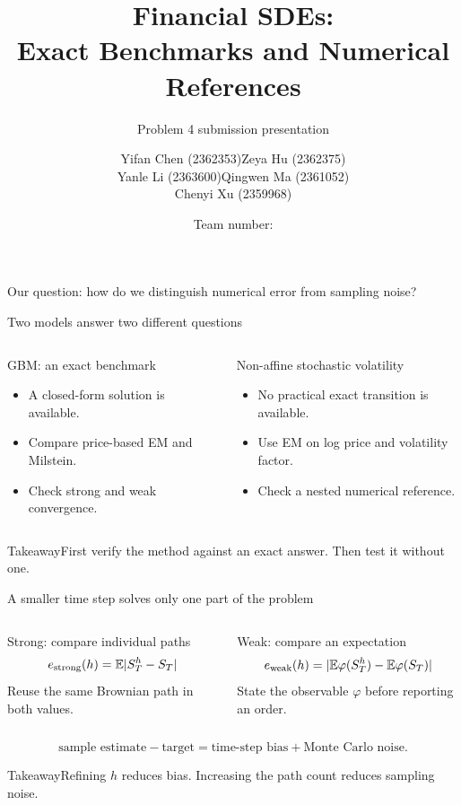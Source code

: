 \documentclass[aspectratio=169,10pt]{beamer}
\title[Financial SDEs]{Financial SDEs:\\Exact Benchmarks and Numerical References}
\subtitle{Problem 4 submission presentation}
\author{\texorpdfstring{\small
  Yifan Chen (2362353)\quad Zeya Hu (2362375)\\[.25em]
  Yanle Li (2363600)\quad Qingwen Ma (2361052)\\[.25em]
  Chenyi Xu (2359968)}{Yifan Chen, Zeya Hu, Yanle Li, Qingwen Ma, Chenyi Xu}}
\institute{Numerical Partial Differential Equations}
\date{Team number: \TeamNumber}
\newcommand{\E}{\mathbb E}
\newcommand{\takeaway}[1]{\begin{block}{Takeaway}\small #1\end{block}}
\begin{document}
\begin{frame}
  \titlepage
  \vspace{-1.1em}
  \centering\small Our question: how do we distinguish numerical error from sampling noise?
\end{frame}

\begin{frame}{Two models answer two different questions}
  \begin{columns}[T]
    \begin{block}{GBM: an exact benchmark}
      \begin{itemize}
        \item A closed-form solution is available.
        \item Compare price-based EM and Milstein.
        \item Check strong and weak convergence.
      \end{itemize}
    \end{block}
    \begin{block}{Non-affine stochastic volatility}
      \begin{itemize}
        \item No practical exact transition is available.
        \item Use EM on log price and volatility factor.
        \item Check a nested numerical reference.
      \end{itemize}
    \end{block}
  \end{columns}
  \vspace{.5em}
  \takeaway{First verify the method against an exact answer. Then test it without one.}
\end{frame}

\begin{frame}{A smaller time step solves only one part of the problem}
  \begin{columns}[T]
    \begin{block}{Strong: compare individual paths}
      \[e_{\rm strong}(h)=\E|S_T^h-S_T|\]
      Reuse the same Brownian path in both values.
    \end{block}
    \begin{block}{Weak: compare an expectation}
      \[e_{\rm weak}(h)=|\E\varphi(S_T^h)-\E\varphi(S_T)|\]
      State the observable $\varphi$ before reporting an order.
    \end{block}
  \end{columns}
  \[\text{sample estimate}-\text{target}
     =\text{time-step bias}+\text{Monte Carlo noise}.\]
  \takeaway{Refining $h$ reduces bias. Increasing the path count reduces sampling noise.}
\end{frame}
\end{document}

